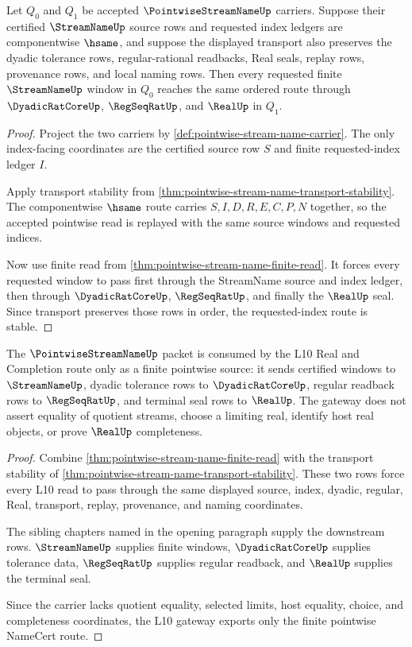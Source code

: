 \begin{theorem}
\label{thm:pointwise-stream-index-stability}
Let $Q_0$ and $Q_1$ be accepted $\PointwiseStreamNameUp$ carriers. Suppose their certified $\StreamNameUp$ source rows and requested index ledgers are componentwise $\hsame$, and suppose the displayed transport also preserves the dyadic tolerance rows, regular-rational readbacks, Real seals, replay rows, provenance rows, and local naming rows. Then every requested finite $\StreamNameUp$ window in $Q_0$ reaches the same ordered route through $\DyadicRatCoreUp$, $\RegSeqRatUp$, and $\RealUp$ in $Q_1$.
\end{theorem}
\begin{proof}
Project the two carriers by \autoref{def:pointwise-stream-name-carrier}. The only index-facing coordinates are the certified source row $S$ and finite requested-index ledger $I$.

Apply transport stability from \autoref{thm:pointwise-stream-name-transport-stability}. The componentwise $\hsame$ route carries $S,I,D,R,E,C,P,N$ together, so the accepted pointwise read is replayed with the same source windows and requested indices.

Now use finite read from \autoref{thm:pointwise-stream-name-finite-read}. It forces every requested window to pass first through the StreamName source and index ledger, then through $\DyadicRatCoreUp$, $\RegSeqRatUp$, and finally the $\RealUp$ seal. Since transport preserves those rows in order, the requested-index route is stable.
\end{proof}

\begin{theorem}
\label{thm:pointwise-stream-name-l10-gateway}
The $\PointwiseStreamNameUp$ packet is consumed by the L10 Real and Completion route only as a finite pointwise source: it sends certified windows to $\StreamNameUp$, dyadic tolerance rows to $\DyadicRatCoreUp$, regular readback rows to $\RegSeqRatUp$, and terminal seal rows to $\RealUp$. The gateway does not assert equality of quotient streams, choose a limiting real, identify host real objects, or prove $\RealUp$ completeness.
\end{theorem}
\begin{proof}
Combine \autoref{thm:pointwise-stream-name-finite-read} with the transport stability of \autoref{thm:pointwise-stream-name-transport-stability}. These two rows force every L10 read to pass through the same displayed source, index, dyadic, regular, Real, transport, replay, provenance, and naming coordinates.

The sibling chapters named in the opening paragraph supply the downstream rows. $\StreamNameUp$ supplies finite windows, $\DyadicRatCoreUp$ supplies tolerance data, $\RegSeqRatUp$ supplies regular readback, and $\RealUp$ supplies the terminal seal.

Since the carrier lacks quotient equality, selected limits, host equality, choice, and completeness coordinates, the L10 gateway exports only the finite pointwise NameCert route.
\end{proof}

